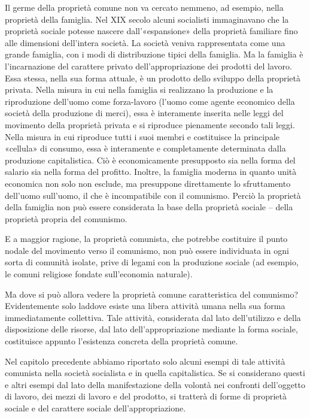 \documentclass[../main]{subfiles}
\begin{document}
Il germe della proprietà comune non va cercato nemmeno, ad esempio, nella proprietà della famiglia. Nel XIX secolo alcuni socialisti immaginavano che la proprietà sociale potesse nascere dall'«espansione» della proprietà familiare fino alle dimensioni dell'intera società. La società veniva rappresentata come una grande famiglia, con i modi di distribuzione tipici della famiglia. Ma la famiglia è l'incarnazione del carattere privato dell'appropriazione dei prodotti del lavoro. Essa stessa, nella sua forma attuale, è un prodotto dello sviluppo della proprietà privata. Nella misura in cui nella famiglia si realizzano la produzione e la riproduzione dell'uomo come forza-lavoro (l'uomo come agente economico della società della produzione di merci), essa è interamente inserita nelle leggi del movimento della proprietà privata e si riproduce pienamente secondo tali leggi. Nella misura in cui riproduce tutti i suoi membri e costituisce la principale «cellula» di consumo, essa è interamente e completamente determinata dalla produzione capitalistica. Ciò è economicamente presupposto sia nella forma del salario sia nella forma del profitto. Inoltre, la famiglia moderna in quanto unità economica non solo non esclude, ma presuppone direttamente lo sfruttamento dell'uomo sull'uomo, il che è incompatibile con il comunismo. Perciò la proprietà della famiglia non può essere considerata la base della proprietà sociale – della proprietà propria del comunismo.

E a maggior ragione, la proprietà comunista, che potrebbe costituire il punto nodale del movimento verso il comunismo, non può essere individuata in ogni sorta di comunità isolate, prive di legami con la produzione sociale (ad esempio, le comuni religiose fondate sull'economia naturale).

Ma dove si può allora vedere la proprietà comune caratteristica del comunismo? Evidentemente solo laddove esiste una libera attività umana nella sua forma immediatamente collettiva. Tale attività, considerata dal lato dell'utilizzo e della disposizione delle risorse, dal lato dell'appropriazione mediante la forma sociale, costituisce appunto l'esistenza concreta della proprietà comune.

Nel capitolo precedente abbiamo riportato solo alcuni esempi di tale attività comunista nella società socialista e in quella capitalistica. Se si considerano questi e altri esempi dal lato della manifestazione della volontà nei confronti dell'oggetto di lavoro, dei mezzi di lavoro e del prodotto, si tratterà di forme di proprietà sociale e del carattere sociale dell'appropriazione.
\end{document}
